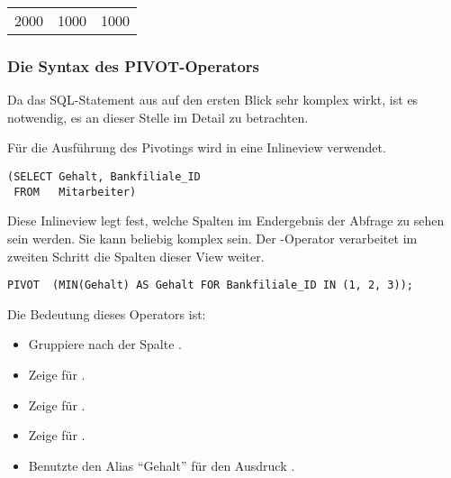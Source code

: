 \begin{center}
    \begin{small}
        \tablehead{}

        \begin{oraclesql}
            \begin{supertabular}{rrr}
                2000 & 1000 & 1000 \\
            \end{supertabular}
        \end{oraclesql}
    \end{small}
\end{center}
\subsubsection{Die Syntax des PIVOT-Operators}
Da das SQL-Statement aus  auf den ersten Blick sehr komplex wirkt, ist es notwendig, es an dieser Stelle im Detail zu betrachten.

Für die Ausführung des Pivotings wird in  eine Inlineview verwendet.
\begin{lstlisting}[language=oracle_sql,caption={Die Inlineview},label=sql06_18]
(SELECT Gehalt, Bankfiliale_ID
 FROM   Mitarbeiter)
          \end{lstlisting}
Diese Inlineview legt fest, welche Spalten im Endergebnis der Abfrage zu sehen sein werden. Sie kann beliebig komplex sein. Der -Operator verarbeitet im zweiten Schritt die Spalten dieser View weiter.
\begin{lstlisting}[language=oracle_sql,caption={Der \languageorasql{PIVOT}-Operator},label=sql06_19]
PIVOT  (MIN(Gehalt) AS Gehalt FOR Bankfiliale_ID IN (1, 2, 3));
          \end{lstlisting}
Die Bedeutung dieses Operators ist:
\begin{itemize}
    \item Gruppiere nach der Spalte .
    \item Zeige  für .
    \item Zeige  für .
    \item Zeige  für .
    \item Benutzte den Alias \enquote{Gehalt} für den Ausdruck .
\end{itemize}
